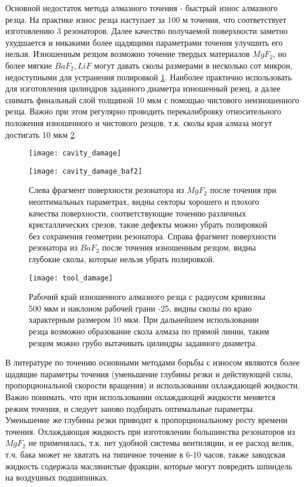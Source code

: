 Основной недостаток метода алмазного точения - быстрый износ алмазного резца. На практике износ резца наступает за 100 м точения, что соответствует изготовлению 3 резонаторов. Далее качество получаемой поверхности заметно ухудшается и никакими более щадящими параметрами точения улучшить его нельзя. Изношенным резцом возможно точение твердых материалов $MgF_2$, но более мягкие $BaF_2, LiF$ могут давать сколы размерами в несколько сот микрон, недоступными для устранения полировкой \ref{cavity_damage}. Наиболее практично использовать для изготовления цилиндров заданного диаметра изношенный резец, а далее снимать финальный слой толщиной 10 мкм с помощью чистового неизношенного резца. Важно при этом регулярно проводить перекалибровку относительного положения изношенного и чистового резцов, т.к. сколы края алмаза могут достигать 10 мкм \ref{tool_damage}.

\begin{figure}[ht]
  \begin{minipage}[ht]{0.49\linewidth}\centering
    \texttt{[image: cavity\_damage]}
  \end{minipage}
  \hfill
  \begin{minipage}[ht]{0.49\linewidth}\centering
    \texttt{[image: cavity\_damage\_baf2]}
  \end{minipage}
  \caption{Слева фрагмент поверхности резонатора из $MgF_2$ после точения при неоптимальных параметрах, видны секторы хорошего и плохого качества поверхности, соответствующие точению различных кристаллических срезов, такие дефекты можно убрать полировкой без сохранения геометрии резонатора. Справа фрагмент поверхности резонатора из $BaF_2$ после точения изношенным резцом, видны глубокие сколы, которые нельзя убрать полировкой.}
  \label{cavity_damage}
\end{figure}

\begin{figure}[ht]
\centering
  \texttt{[image: tool\_damage]}
  \caption{Рабочий край изношенного алмазного резца с радиусом кривизны 500 мкм и наклоном рабочей грани -25, видны сколы по краю характерным размером 10 мкм. При дальнейшем использовании резца возможно образование скола алмаза по прямой линии, таким резцом можно грубо вытачивать цилиндры заданного диаметра.}
  \label{tool_damage}
\end{figure}

В литературе по точению основными методами борьбы с износом являются более щадящие параметры точения (уменьшение глубины резки и действующей силы, пропорциональной скорости вращения) и использовании охлаждающей жидкости. Важно понимать, что при использовании охлаждающей жидкости меняется режим точения, и следует заново подбирать оптимальные параметры. Уменьшение же глубины резки приводит к пропорциональному росту времени точения. Охлаждающая жидкость при изготовлении большинства резонаторов из $MgF_2$ не применялась, т.к. нет удобной системы вентиляции, и ее расход велик, т.ч. бака может не хватать на типичное точение в 6-10 часов, также заводская жидкость содержала маслянистые фракции, которые могут повредить шпиндель на воздушных подшипниках.

